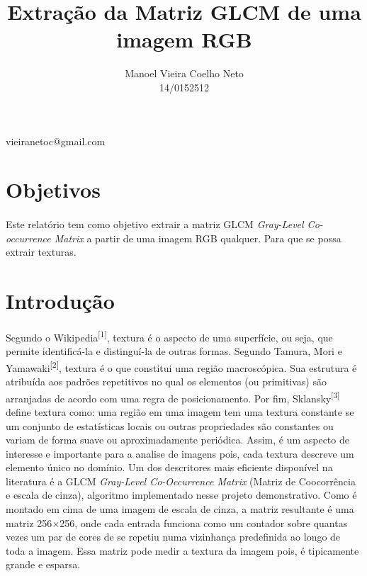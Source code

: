 \documentclass[conference,harvard,brazil,english]{sbatex}
\begin{document}
	\title{Extração da Matriz GLCM de uma imagem RGB}
	\author{Manoel Vieira Coelho Neto\\14/0152512}{vieiranetoc@gmail.com}
	\address{SQS 203 Bloco J\\ Brasília, DF, Brasil}
	
	\twocolumn[{
		\maketitle		
	}]
	\section{Objetivos}
	\paragraph{} Este relatório tem como objetivo extrair a matriz GLCM \textit{Gray-Level Co-occurrence Matrix} a partir de uma imagem RGB qualquer. Para que se possa extrair texturas.
	
	\section{Introdução}
	\par Segundo o Wikipedia\textsuperscript{[1]}, textura é o aspecto de uma superfície, ou seja, que permite identificá-la e distinguí-la de outras formas. Segundo Tamura, Mori e Yamawaki\textsuperscript{[2]}, textura é o que constitui uma região macroscópica. Sua estrutura é atribuída aos	padrões repetitivos no qual os elementos (ou primitivas) são arranjadas de acordo com uma regra de posicionamento. Por fim, Sklansky\textsuperscript{[3]} define textura como: uma região em uma imagem tem uma textura constante se um conjunto de estatísticas locais ou outras propriedades são constantes ou variam de forma suave ou aproximadamente periódica. Assim, é um aspecto de interesse e importante para a analise de imagens pois, cada textura descreve um elemento único no domínio. Um dos descritores mais eficiente disponível na literatura é a GLCM \textit{Gray-Level Co-Occurrence Matrix} (Matriz de Coocorrência e escala de cinza), algoritmo implementado nesse projeto demonstrativo. Como é montado em cima de uma imagem de escala de cinza, a matriz resultante é uma matriz 256$\times$256, onde cada entrada funciona como um contador sobre quantas vezes um par de cores de se repetiu numa vizinhança predefinida ao longo de toda a imagem. Essa matriz pode medir a textura da imagem pois, é tipicamente grande e esparsa.
	
\end{document}

